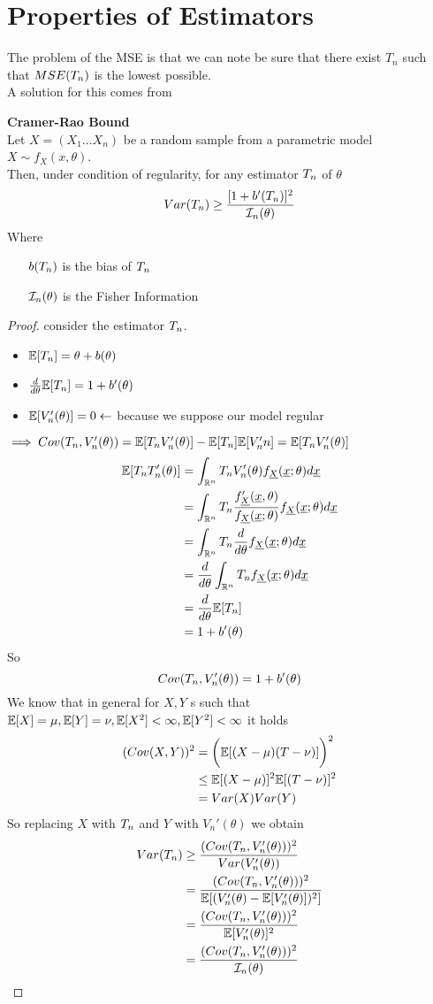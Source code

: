 \section{Properties of Estimators}
The problem of the MSE is that we can note be sure that there exist $T_n$ such that $MSE (T_{n})$ is the lowest possible.\\
A solution for this comes from
\begin{teo}\label{teo:Cramer-Rao Bound}
	\textbf{Cramer-Rao Bound}\\
			Let $X=(X_1... X_n)$ be a random sample from a parametric model $X\sim f_X(x,\theta)$.\\
			Then, under condition of regularity, for any estimator $T_{n}$ of $\theta$ 
			\[
			Var(T_{n})\geq \frac{[1+b'(T_{n})]^2}{\mathcal{I}_n(\theta)}
			\]
Where
\begin{itemize}
	\item[$b(T_{n})$] is the bias of $T_{n}$
	\item[$\mathcal{I}_n(\theta)$] is the Fisher Information
\end{itemize}
\end{teo}
\begin{proof}
	consider the estimator $T_{n}$.
	\begin{itemize}
		\item $\mathbb{E}[T_{n}]=\theta +b(\theta)$
		\item $\frac{d}{d\theta} \mathbb{E}[T_{n}]=1+b'(\theta)$
		\item $\mathbb{E}[V_n'(\theta)]=0 \leftarrow$ because we suppose our model regular
	\end{itemize}
$\implies Cov(T_{n}, V_n'(\theta))=\mathbb{E}[T_{n} V_n'(\theta)] - \mathbb{E}[T_{n}]\mathbb{E}[V_n'n]=\mathbb{E}[T_{n} V_n'(\theta)]$ 
\[
\begin{split}
\mathbb{E}[T_{n} T_n'(\theta)]&
=\int_{\mathbb{R}^n}T_{n} V_n'(\theta) f_{\underline X}(\underline{x};\theta) d\underline x\\
&=\int_{\mathbb{R}^n}T_{n} \frac{f_{\underline X}'(\underline x,\theta)}{f_{\underline X}(\underline{x};\theta)}f_{\underline X}(\underline{x};\theta) d\underline x\\
&=\int_{\mathbb{R}^n}T_{n} \frac{d}{d\theta} f_{\underline X}(\underline{x};\theta) d\underline x\\
&=\frac{d}{d\theta} \int_{\mathbb{R}^n}T_{n} f_{\underline X}(\underline{x};\theta) d\underline x\\
&=\frac{d}{d\theta} \mathbb{E}[T_{n}]\\
&=1+b'(\theta)
\end{split}
\]
So
\[
Cov(T_{n},V_n'(\theta))=1+b'(\theta)
\]
We know that in general for $X,Y$ \rv s such that $\mathbb{E}[X]=\mu, \mathbb{E}[Y]=\nu, \mathbb{E}[X^2]<\infty, \mathbb{E}[Y^2]<\infty$ it holds
\[
\begin{split}
(Cov(X,Y))^2&=\bigg( \mathbb{E}[(X-\mu)(T-\nu)] \bigg)^2\\
&\leq  \mathbb{E}[(X-\mu)]^2 \mathbb{E}[(T-\nu)]^2\\
&= Var(X)Var(Y)
\end{split}
\]
So replacing $X$ with $T_{n}$ and $Y$ with $V_n'(\theta)$ we  obtain
\[
\begin{split}
Var(T_{n})&\geq \frac{(Cov(T_{n},V_n'(\theta)))^2}{Var(V_n'(\theta))}\\
&=\frac{(Cov(T_{n},V_n'(\theta)))^2}{\mathbb{E}[(V_n'(\theta)-\mathbb{E}[V_n'(\theta)])^2]}\\
&=\frac{(Cov(T_{n},V_n'(\theta)))^2}{\mathbb{E}[V_n'(\theta)]^2}\\
&=\frac{(Cov(T_{n},V_n'(\theta)))^2}{\mathcal{I}_n(\theta)}
\end{split}
\]
\end{proof}
